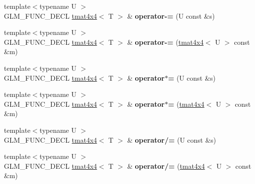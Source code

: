 \begin{DoxyCompactItemize}
\item 
\hypertarget{structglm_1_1detail_1_1tmat4x4_a8ec28385da09ad2ff5a749ad312390e3}{{\footnotesize template$<$typename U $>$ }\\G\-L\-M\-\_\-\-F\-U\-N\-C\-\_\-\-D\-E\-C\-L \hyperlink{structglm_1_1detail_1_1tmat4x4}{tmat4x4}$<$ T $>$ \& {\bfseries operator-\/=} (U const \&s)}\label{structglm_1_1detail_1_1tmat4x4_a8ec28385da09ad2ff5a749ad312390e3}

\item 
\hypertarget{structglm_1_1detail_1_1tmat4x4_adfea448305e104849f610918a7fcb52e}{{\footnotesize template$<$typename U $>$ }\\G\-L\-M\-\_\-\-F\-U\-N\-C\-\_\-\-D\-E\-C\-L \hyperlink{structglm_1_1detail_1_1tmat4x4}{tmat4x4}$<$ T $>$ \& {\bfseries operator-\/=} (\hyperlink{structglm_1_1detail_1_1tmat4x4}{tmat4x4}$<$ U $>$ const \&m)}\label{structglm_1_1detail_1_1tmat4x4_adfea448305e104849f610918a7fcb52e}

\item 
\hypertarget{structglm_1_1detail_1_1tmat4x4_ab6b5928af3defe6294781e7f4986005f}{{\footnotesize template$<$typename U $>$ }\\G\-L\-M\-\_\-\-F\-U\-N\-C\-\_\-\-D\-E\-C\-L \hyperlink{structglm_1_1detail_1_1tmat4x4}{tmat4x4}$<$ T $>$ \& {\bfseries operator$\ast$=} (U const \&s)}\label{structglm_1_1detail_1_1tmat4x4_ab6b5928af3defe6294781e7f4986005f}

\item 
\hypertarget{structglm_1_1detail_1_1tmat4x4_a982bc2cf263dd6e85bb802c7812871b0}{{\footnotesize template$<$typename U $>$ }\\G\-L\-M\-\_\-\-F\-U\-N\-C\-\_\-\-D\-E\-C\-L \hyperlink{structglm_1_1detail_1_1tmat4x4}{tmat4x4}$<$ T $>$ \& {\bfseries operator$\ast$=} (\hyperlink{structglm_1_1detail_1_1tmat4x4}{tmat4x4}$<$ U $>$ const \&m)}\label{structglm_1_1detail_1_1tmat4x4_a982bc2cf263dd6e85bb802c7812871b0}

\item 
\hypertarget{structglm_1_1detail_1_1tmat4x4_a5428eec9c39ed1a4115d33ae720a802f}{{\footnotesize template$<$typename U $>$ }\\G\-L\-M\-\_\-\-F\-U\-N\-C\-\_\-\-D\-E\-C\-L \hyperlink{structglm_1_1detail_1_1tmat4x4}{tmat4x4}$<$ T $>$ \& {\bfseries operator/=} (U const \&s)}\label{structglm_1_1detail_1_1tmat4x4_a5428eec9c39ed1a4115d33ae720a802f}

\item 
\hypertarget{structglm_1_1detail_1_1tmat4x4_ac228a623520be677120f66ad4cfa77af}{{\footnotesize template$<$typename U $>$ }\\G\-L\-M\-\_\-\-F\-U\-N\-C\-\_\-\-D\-E\-C\-L \hyperlink{structglm_1_1detail_1_1tmat4x4}{tmat4x4}$<$ T $>$ \& {\bfseries operator/=} (\hyperlink{structglm_1_1detail_1_1tmat4x4}{tmat4x4}$<$ U $>$ const \&m)}\label{structglm_1_1detail_1_1tmat4x4_ac228a623520be677120f66ad4cfa77af}


\end{DoxyCompactItemize}
